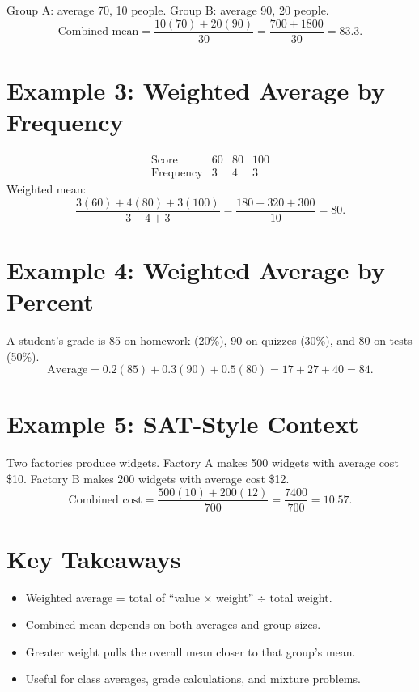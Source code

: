 \documentclass[14pt]{extarticle}
\begin{document}
Group A: average 70, 10 people.  
Group B: average 90, 20 people.  
\[
\text{Combined mean} = \frac{10(70)+20(90)}{30} = \frac{700+1800}{30} = \boxed{83.3}.
\]

\section*{Example 3: Weighted Average by Frequency}

\[
\begin{array}{c|ccc}
\text{Score} & 60 & 80 & 100\\ \hline
\text{Frequency} & 3 & 4 & 3
\end{array}
\]
Weighted mean:
\[
\frac{3(60)+4(80)+3(100)}{3+4+3} = \frac{180+320+300}{10} = \boxed{80}.
\]

\section*{Example 4: Weighted Average by Percent}

A student’s grade is 85 on homework (20\%), 90 on quizzes (30\%), and 80 on tests (50\%).  
\[
\text{Average} = 0.2(85) + 0.3(90) + 0.5(80) = 17 + 27 + 40 = \boxed{84}.
\]

\section*{Example 5: SAT-Style Context}

Two factories produce widgets. Factory A makes 500 widgets with average cost \$10.  
Factory B makes 200 widgets with average cost \$12.  
\[
\text{Combined cost} = \frac{500(10)+200(12)}{700} = \frac{7400}{700} = \boxed{10.57}.
\]

\section*{Key Takeaways}
\begin{itemize}
  \item Weighted average = total of “value × weight” ÷ total weight.
  \item Combined mean depends on both averages and group sizes.
  \item Greater weight pulls the overall mean closer to that group’s mean.
  \item Useful for class averages, grade calculations, and mixture problems.
\end{itemize}

\newpage
\end{document}
